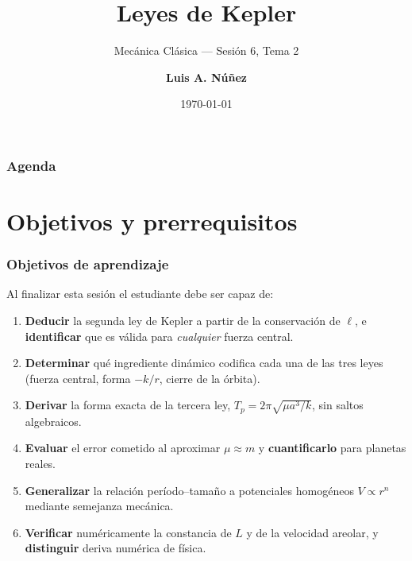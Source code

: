 \documentclass[10pt]{beamer}
\newcommand{\vell}{\boldsymbol{\ell}}   %
\begin{document}
\title[Leyes de Kepler]{\textbf{Leyes de Kepler}}
\subtitle{Mecánica Clásica --- Sesión 6, Tema 2}
\author[L.A. Núñez]{\textbf{Luis A. Núñez}}
\date{\today}

\begin{frame}[plain]
  \titlepage
\end{frame}

\begin{frame}
  \frametitle{Agenda}
  \tableofcontents
\end{frame}

\section{Objetivos y prerrequisitos}

\begin{frame}
\frametitle{Objetivos de aprendizaje}
Al finalizar esta sesión el estudiante debe ser capaz de:
\begin{enumerate}
  \item<1-> \textbf{Deducir} la segunda ley de Kepler a partir de la conservación
        de $\vell$, e \textbf{identificar} que es válida para
        \emph{cualquier} fuerza central.
  \item<2-> \textbf{Determinar} qué ingrediente dinámico codifica cada una de las
        tres leyes (fuerza central, forma $-k/r$, cierre de la órbita).
  \item<3-> \textbf{Derivar} la forma exacta de la tercera ley,
        $T_p=2\pi\sqrt{\mu a^{3}/k}$, sin saltos algebraicos.
  \item<4-> \textbf{Evaluar} el error cometido al aproximar $\mu\approx m$ y
        \textbf{cuantificarlo} para planetas reales.
  \item<5-> \textbf{Generalizar} la relación período--tamaño a potenciales
        homogéneos $V\propto r^{n}$ mediante semejanza mecánica.
  \item<6-> \textbf{Verificar} numéricamente la constancia de $L$ y de la
        velocidad areolar, y \textbf{distinguir} deriva numérica de física.
\end{enumerate}
\end{frame}
\end{document}
